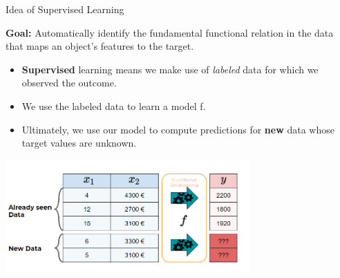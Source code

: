 \begin{vbframe}{Idea of Supervised Learning}


\textbf{Goal:} Automatically identify the fundamental functional relation in the data
  that maps an object's features to the target.

\begin{itemize}

  \item \textbf{Supervised} learning means we make use of \emph{labeled}
  data for which we observed the outcome.


  \item We use the labeled data to learn a model f.

  \item Ultimately, we use our model to compute predictions for
  \textbf{new} data whose target values are unknown.

\end{itemize}

\begin{center}
  \includegraphics[width=0.7\textwidth]{figure_man/what_is_a_model_web}
\end{center}
\end{vbframe}

\framebreak







